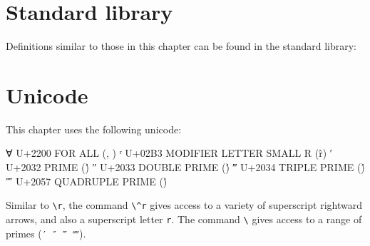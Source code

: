 \hypertarget{standard-library}{%
\section{Standard library}\label{standard-library}}

Definitions similar to those in this chapter can be found in the
standard library:

\begin{fence}
\begin{code}%
\>[0]\AgdaSpace{}%
\AgdaSpace{}%
\AgdaSpace{}%
\AgdaSymbol{(}\AgdaSymbol{;}\AgdaSpace{}%
\AgdaSymbol{;}\AgdaSpace{}%
\AgdaSymbol{;}\AgdaSpace{}%
\AgdaSymbol{)}\<%
\end{code}
\end{fence}

\hypertarget{unicode}{%
\section{Unicode}\label{unicode}}

This chapter uses the following unicode:

\begin{myDisplay}
∀  U+2200  FOR ALL (\forall, \all)
ʳ  U+02B3  MODIFIER LETTER SMALL R (\^r)
′  U+2032  PRIME (\')
″  U+2033  DOUBLE PRIME (\')
‴  U+2034  TRIPLE PRIME (\')
⁗  U+2057  QUADRUPLE PRIME (\')
\end{myDisplay}

Similar to \texttt{\textbackslash{}r}, the command
\texttt{\textbackslash{}\^{}r} gives access to a variety of superscript
rightward arrows, and also a superscript letter \texttt{r}. The command
\texttt{\textbackslash{}\textquotesingle{}} gives access to a range of
primes (\texttt{′\ ″\ ‴\ ⁗}).

